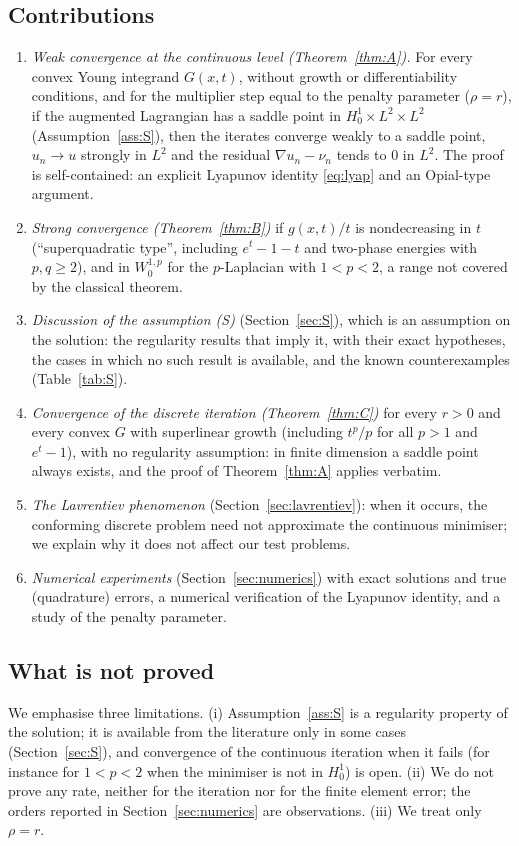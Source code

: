 \documentclass[11pt]{amsart}
\theoremstyle{definition}
\theoremstyle{remark}
\numberwithin{equation}{section}
\begin{document}
\subsection*{Contributions}
\begin{enumerate}[label=(\arabic*),leftmargin=2em]
\item \emph{Weak convergence at the continuous level (Theorem~\ref{thm:A}).} For every convex Young integrand $G(x,t)$, without growth or differentiability conditions, and for the multiplier step equal to the penalty parameter ($\rho=r$), if the augmented Lagrangian has a saddle point in $H^1_0\times L^2\times L^2$ (Assumption~\ref{ass:S}), then the iterates converge weakly to a saddle point, $u_n\to u$ strongly in $L^2$ and the residual $\nabla u_n-\nu_n$ tends to $0$ in $L^2$. The proof is self-contained: an explicit Lyapunov identity \eqref{eq:lyap} and an Opial-type argument.
\item \emph{Strong convergence (Theorem~\ref{thm:B})} if $g(x,t)/t$ is nondecreasing in $t$ (``superquadratic type'', including $e^t-1-t$ and two-phase energies with $p,q\ge2$), and in $W^{1,p}_0$ for the $p$-Laplacian with $1<p<2$, a range not covered by the classical theorem.
\item \emph{Discussion of the assumption (S)} (Section~\ref{sec:S}), which is an assumption on the solution: the regularity results that imply it, with their exact hypotheses, the cases in which no such result is available, and the known counterexamples (Table~\ref{tab:S}).
\item \emph{Convergence of the discrete iteration (Theorem~\ref{thm:C})} for every $r>0$ and every convex $G$ with superlinear growth (including $t^p/p$ for all $p>1$ and $e^t-1$), with no regularity assumption: in finite dimension a saddle point always exists, and the proof of Theorem~\ref{thm:A} applies verbatim.
\item \emph{The Lavrentiev phenomenon} (Section~\ref{sec:lavrentiev}): when it occurs, the conforming discrete problem need not approximate the continuous minimiser; we explain why it does not affect our test problems.
\item \emph{Numerical experiments} (Section~\ref{sec:numerics}) with exact solutions and true (quadrature) errors, a numerical verification of the Lyapunov identity, and a study of the penalty parameter.
\end{enumerate}

\subsection*{What is not proved}
We emphasise three limitations. (i) Assumption~\ref{ass:S} is a regularity property of the solution; it is available from the literature only in some cases (Section~\ref{sec:S}), and convergence of the continuous iteration when it fails (for instance for $1<p<2$ when the minimiser is not in $H^1_0$) is open. (ii) We do not prove any rate, neither for the iteration nor for the finite element error; the orders reported in Section~\ref{sec:numerics} are observations. (iii) We treat only $\rho=r$.
\end{document}
